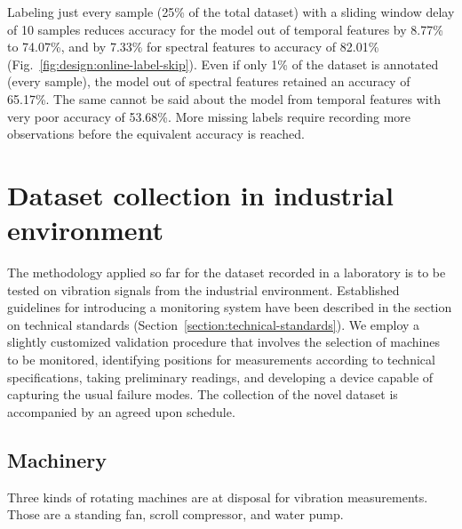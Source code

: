 Labeling just every  sample (25\% of the total dataset) with a sliding window delay of 10 samples reduces accuracy for the model out of temporal features by 8.77\% to 74.07\%, and by 7.33\% for spectral features to accuracy of 82.01\% (Fig.~\ref{fig:design:online-label-skip}). Even if only 1\% of the dataset is annotated (every  sample), the model out of spectral features retained an accuracy of 65.17\%. The same cannot be said about the model from temporal features with very poor accuracy of 53.68\%. More missing labels require recording more observations before the equivalent accuracy is reached.

\section{Dataset collection in industrial environment}
The methodology applied so far for the dataset recorded in a laboratory is to be tested on vibration signals from the industrial environment. Established guidelines for introducing a monitoring system have been described in the section on technical standards (Section~\ref{section:technical-standards}). We employ a slightly customized validation procedure that involves the selection of machines to be monitored, identifying positions for measurements according to technical specifications, taking preliminary readings, and developing a device capable of capturing the usual failure modes. The collection of the novel dataset is accompanied by an agreed upon schedule.

\subsection{Machinery}
Three kinds of rotating machines are at disposal for vibration measurements. Those are a standing fan, scroll compressor, and water pump.

